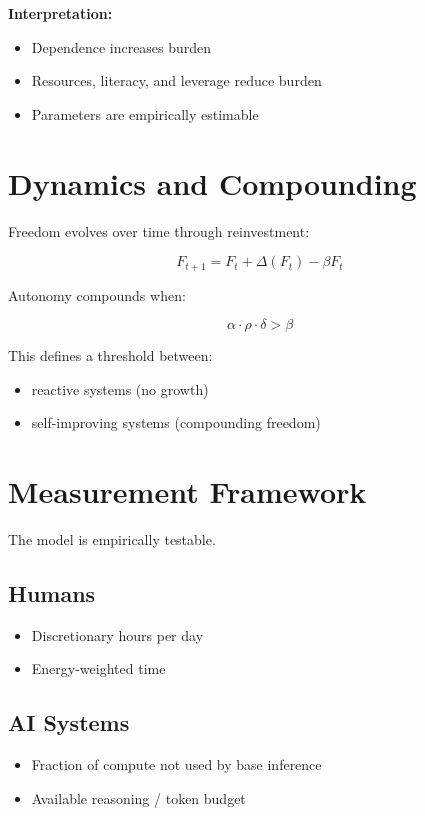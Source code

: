\documentclass[11pt]{article}
\begin{document}
\textbf{Interpretation:}
\begin{itemize}
\item Dependence increases burden
\item Resources, literacy, and leverage reduce burden
\item Parameters are empirically estimable
\end{itemize}

\section{Dynamics and Compounding}

Freedom evolves over time through reinvestment:

\[
F_{t+1} = F_t + \Delta(F_t) - \beta F_t
\]

Autonomy compounds when:

\[
\alpha \cdot \rho \cdot \delta > \beta
\]

This defines a threshold between:
\begin{itemize}
\item reactive systems (no growth)
\item self-improving systems (compounding freedom)
\end{itemize}

\section{Measurement Framework}

The model is empirically testable.

\subsection{Humans}
\begin{itemize}
\item Discretionary hours per day
\item Energy-weighted time
\end{itemize}

\subsection{AI Systems}
\begin{itemize}
\item Fraction of compute not used by base inference
\item Available reasoning / token budget
\end{itemize}
\end{document}
